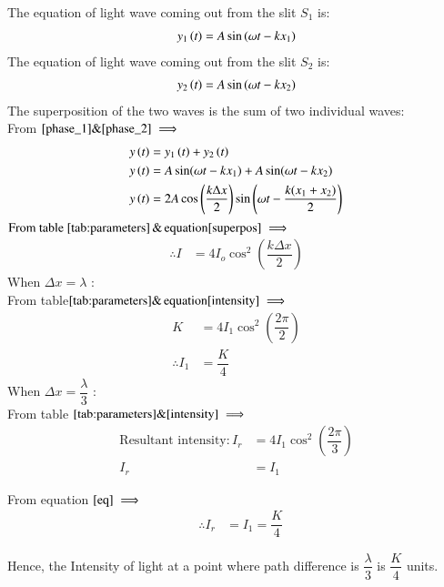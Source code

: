 \documentclass[journal,12pt,twocolumn]{IEEEtran}
\theoremstyle{remark}
\begin{document}
The equation of light wave coming out from the slit $S_1$ is:
\begin{align}
    y_1\left(t\right) = A\sin{(\omega t - kx_1)} \label{phase_1}
\end{align}
The equation of light wave coming out from the slit $S_2$ is:
\begin{align}
     y_2\left(t\right) = A\sin{(\omega t - kx_2)} \label{phase_2}
\end{align}
The superposition of the two waves is the sum of two individual waves: \\
From $\eqref{phase_1} \& \eqref{phase_2} \implies$
\begin{align}
y\left(t\right) &= y_1\left(t\right) + y_2\left(t\right)  \\
y\left(t\right) &= A\sin({\omega t - kx_1})  + A\sin({ \omega t - kx_2}) \nonumber \\
y\left(t\right) &=  2A\cos\left(\dfrac{k\Delta x}{2}\right)\sin\left(\omega t - \dfrac{k(x_1+x_2)}{2} \right) \label{superpos}
\end{align}
$\text{From table }\eqref{tab:parameters}\, \& \,\text{equation}\eqref{superpos} \implies $ 
\begin{align}
\therefore I &= 4I_o\cos^2\left(\dfrac{k\Delta x}{2}\right)  \label{intensity}
\end{align}
When $\Delta x = \lambda$ : \\
From table$ \eqref{tab:parameters} \& \,\text{equation}\eqref{intensity} \implies$ 
\begin{align}
  K &= 4I_1\cos^2\left(\dfrac{2\pi}{2}\right)  \\
 \therefore I_1&=\dfrac{K}{4} \label{eq}
\end{align}
When $\Delta x = \dfrac{\lambda}{3}$ : \\
From table $\eqref{tab:parameters} \& \eqref{intensity} \implies$ 
\begin{align}
\text{Resultant intensity}:I_r &= 4I_1\cos^2\left(\dfrac{2\pi}{3}\right) \nonumber  \\
I_r &= I_1
\end{align}

From equation $ \eqref{eq} \implies$
\hspace*{0.5cm}
\begin{align}
 \,\,\,\, \therefore I_r &= I_1 =\dfrac{K}{4} 
\end{align}

Hence, the Intensity of light at a point where path difference is $\dfrac{\lambda}{3}$ is $\dfrac{K}{4}$ units.


\end{document}

